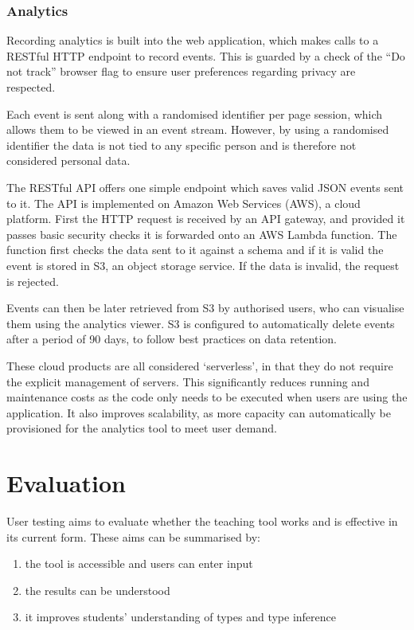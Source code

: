 \documentclass[a4paper,fleqn,12pt]{article}
\begin{document}
\subsubsection{Analytics}\label{id:h.39bhrrv1fi5p}
Recording analytics is built into the web application, which makes calls to a RESTful HTTP endpoint to record events. This is guarded by a check of the “Do not track” browser flag to ensure user preferences regarding privacy are respected.

Each event is sent along with a randomised identifier per page session, which allows them to be viewed in an event stream. However, by using a randomised identifier the data is not tied to any specific person and is therefore not considered personal data.

The RESTful API offers one simple endpoint which saves valid JSON events sent to it. The API is implemented on Amazon Web Services (AWS), a cloud platform. First the HTTP request is received by an API gateway, and provided it passes basic security checks it is forwarded onto an AWS Lambda function. The function first checks the data sent to it against a schema and if it is valid the event is stored in S3, an object storage service. If the data is invalid, the request is rejected.

Events can then be later retrieved from S3 by authorised users, who can visualise them using the analytics viewer. S3 is configured to automatically delete events after a period of 90 days, to follow best practices on data retention.

These cloud products are all considered ‘serverless’, in that they do not require the explicit management of servers. This significantly reduces running and maintenance costs as the code only needs to be executed when users are using the application. It also improves scalability, as more capacity can automatically be provisioned for the analytics tool to meet user demand.
\section{Evaluation}\label{id:h.e6letww4nhn0}
User testing aims to evaluate whether the teaching tool works and is effective in its current form. These aims can be summarised by:
\begin{enumerate}
  \item the tool is accessible and users can enter input
  \item the results can be understood
  \item it improves students’ understanding of types and type inference
\end{enumerate}
\end{document}
